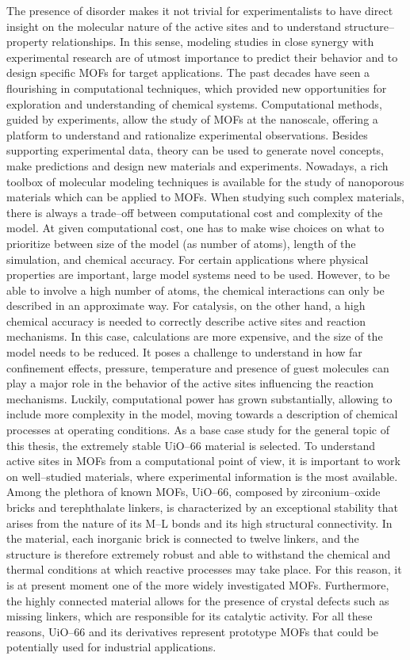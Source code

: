 The presence of disorder makes it not trivial for experimentalists to have direct insight on the molecular nature of the active sites and to understand structure--property relationships. In this sense, modeling studies in close synergy with experimental research are of utmost importance to predict their behavior and to design specific MOFs for target applications. The past decades have seen a flourishing in computational techniques, which provided new opportunities for exploration and understanding of chemical systems. Computational methods, guided by experiments, allow the study of MOFs at the nanoscale, offering a platform to understand and rationalize experimental observations. Besides supporting experimental data, theory can be used to generate novel concepts, make predictions and design new materials and experiments. 
\npar
Nowadays, a rich toolbox of molecular modeling techniques is available for the study of nanoporous materials which can be applied to MOFs. When studying such complex materials, there is always a trade--off between computational cost and complexity of the model. At given computational cost, one has to make wise choices on what to prioritize between size of the model (as number of atoms), length of the simulation, and chemical accuracy. For certain applications where physical properties are important, large model systems need to be used. However, to be able to involve a high number of atoms, the chemical interactions can only be described in an approximate way. For catalysis, on the other hand, a high chemical accuracy is needed to correctly describe active sites and reaction mechanisms. In this case, calculations are more expensive, and the size of the model needs to be reduced. 
It poses a challenge to understand in how far confinement effects, pressure, temperature and presence of guest molecules can play a major role in the behavior of the active sites influencing the reaction mechanisms. Luckily, computational power has grown substantially, allowing to include more complexity in the model, moving towards a description of chemical processes at operating conditions.
\npar
As a base case study for the general topic of this thesis, the extremely stable UiO--66 material is selected. To understand active sites in MOFs from a computational point of view, it is important to work on well--studied materials, where experimental information is the most available. Among the plethora of known MOFs, UiO--66, composed by zirconium--oxide bricks and terephthalate linkers, is characterized by an exceptional stability that arises from the nature of its M--L bonds and its high structural connectivity. In the material, each inorganic brick is connected to twelve linkers, and the structure is therefore extremely robust and able to withstand the chemical and thermal conditions at which reactive processes may take place. For this reason, it is at present moment one of the more widely investigated MOFs. Furthermore, the highly connected material allows for the presence of crystal defects such as missing linkers, which are responsible for its catalytic activity. For all these reasons, UiO--66 and its derivatives represent prototype MOFs that could be potentially used for industrial applications. 
